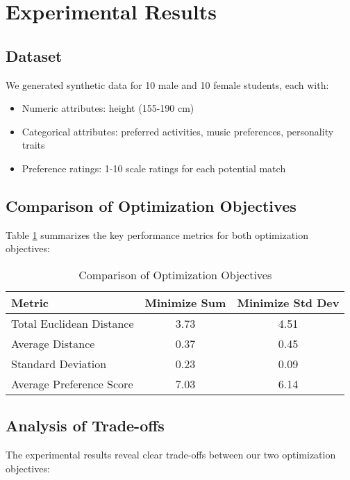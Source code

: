 \documentclass[10pt,journal,compsoc]{IEEEtran}
\begin{document}
\section{Experimental Results}

\subsection{Dataset}
We generated synthetic data for 10 male and 10 female students, each with:
\begin{itemize}
\item Numeric attributes: height (155-190 cm)
\item Categorical attributes: preferred activities, music preferences, personality traits
\item Preference ratings: 1-10 scale ratings for each potential match
\end{itemize}

\subsection{Comparison of Optimization Objectives}

Table \ref{tab:results} summarizes the key performance metrics for both optimization objectives:

\begin{table}[!t]
\caption{Comparison of Optimization Objectives}
\label{tab:results}
\centering
\begin{tabular}{lcc}
\toprule
\textbf{Metric} & \textbf{Minimize Sum} & \textbf{Minimize Std Dev} \\
\midrule
Total Euclidean Distance & 3.73 & 4.51 \\
Average Distance & 0.37 & 0.45 \\
Standard Deviation & 0.23 & 0.09 \\
Average Preference Score & 7.03 & 6.14 \\
\bottomrule
\end{tabular}
\end{table}

\subsection{Analysis of Trade-offs}

The experimental results reveal clear trade-offs between our two optimization objectives:
\end{document}
